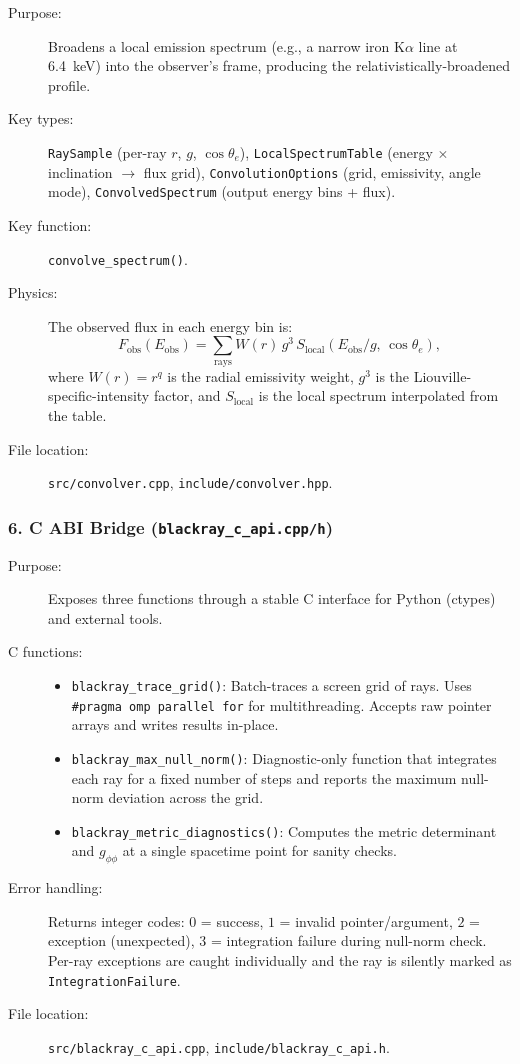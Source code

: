 \documentclass[11pt,twoside]{article}
\begin{document}
\begin{description}
\item[Purpose:] Broadens a local emission spectrum (e.g., a narrow iron
K$\alpha$ line at 6.4~keV) into the observer's frame, producing the
relativistically-broadened profile.
\item[Key types:] \texttt{RaySample} (per-ray $r$, $g$, $\cos\theta_e$),
\texttt{LocalSpectrumTable} (energy $\times$ inclination $\to$ flux grid),
\texttt{ConvolutionOptions} (grid, emissivity, angle mode),
\texttt{ConvolvedSpectrum} (output energy bins + flux).
\item[Key function:] \texttt{convolve\_spectrum()}.
\item[Physics:] The observed flux in each energy bin is:
\begin{equation}
F_{\text{obs}}(E_{\text{obs}}) = \sum_{\text{rays}} W(r)\, g^3\, S_{\text{local}}(E_{\text{obs}}/g,\, \cos\theta_e),
\end{equation}
where $W(r) = r^q$ is the radial emissivity weight, $g^3$ is the
Liouville-specific-intensity factor, and $S_{\text{local}}$ is the local
spectrum interpolated from the table.
\item[File location:] \texttt{src/convolver.cpp}, \texttt{include/convolver.hpp}.
\end{description}

\subsubsection{6. C ABI Bridge (\texttt{blackray\_c\_api.cpp/h})}

\begin{description}
\item[Purpose:] Exposes three functions through a stable C interface for
Python (ctypes) and external tools.
\item[C functions:]
\begin{itemize}
\item \texttt{blackray\_trace\_grid()}: Batch-traces a screen grid of
rays. Uses \texttt{\#pragma omp parallel for} for multithreading. Accepts
raw pointer arrays and writes results in-place.
\item \texttt{blackray\_max\_null\_norm()}: Diagnostic-only function that
integrates each ray for a fixed number of steps and reports the maximum
null-norm deviation across the grid.
\item \texttt{blackray\_metric\_diagnostics()}: Computes the metric
determinant and $g_{\phi\phi}$ at a single spacetime point for sanity checks.
\end{itemize}
\item[Error handling:] Returns integer codes: $0$ = success, $1$ = invalid
pointer/argument, $2$ = exception (unexpected), $3$ = integration failure
during null-norm check. Per-ray exceptions are caught individually and the
ray is silently marked as \texttt{IntegrationFailure}.
\item[File location:] \texttt{src/blackray\_c\_api.cpp},
\texttt{include/blackray\_c\_api.h}.
\end{description}
\end{document}
